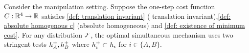  \begin{proposition}\label{prop:optimal simultaneous manipulation general cost}
 Consider the manipulation setting.
    Suppose the one-step cost function $C : \mathbb{R}^4 \to \mathbb{R}$  satisfies \cref{def: translation invariant} ( translation invariant),\cref{def: absolute homogenous c} (absolute homogeneous) and \cref{def: existence of minimum cost}.
    For any distribution $\mathcal{F}$, the optimal simultaneous mechanism uses two stringent tests $h_A^{+},h_B^{+}$ where $h_i^{+}\subset h_i$ for $i\in \{A,B\}$.
    \end{proposition}



